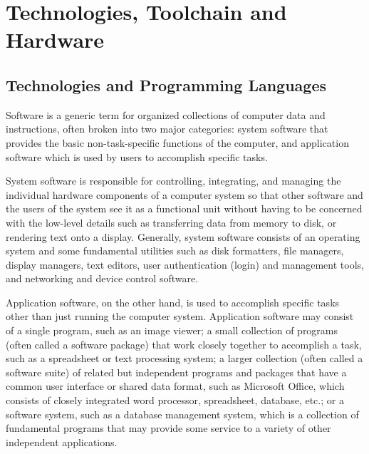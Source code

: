 
\chapter{Technologies, Toolchain and Hardware} %

\label{Technologies, Toolchain and Hardware} %


\section{Technologies and Programming Languages}
Software is a generic term for organized collections of computer data and instructions, often broken into two major categories: system software that provides the basic non-task-specific functions of the computer, and application software which is used by users to accomplish specific tasks.
\newline

System software is responsible for controlling, integrating, and managing the individual hardware components of a computer system so that other software and the users of the system see it as a functional unit without having to be concerned with the low-level details such as transferring data from memory to disk, or rendering text onto a display. Generally, system software consists of an operating system and some fundamental utilities such as disk formatters, file managers, display managers, text editors, user authentication (login) and management tools, and networking and device control software.
\newline

Application software, on the other hand, is used to accomplish specific tasks other than just running the computer system. Application software may consist of a single program, such as an image viewer; a small collection of programs (often called a software package) that work closely together to accomplish a task, such as a spreadsheet or text processing system; a larger collection (often called a software suite) of related but independent programs and packages that have a common user interface or shared data format, such as Microsoft Office, which consists of closely integrated word processor, spreadsheet, database, etc.; or a software system, such as a database management system, which is a collection of fundamental programs that may provide some service to a variety of other independent applications.
\newline

